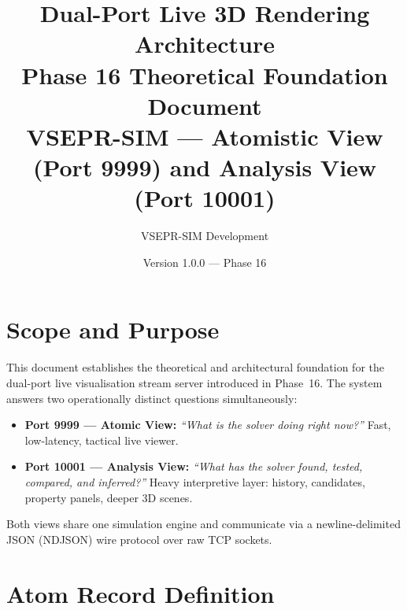 ﻿\documentclass[11pt]{article}
\title{\textbf{Dual-Port Live 3D Rendering Architecture} \\
\Large Phase 16 Theoretical Foundation Document \\[6pt]
\large VSEPR-SIM --- Atomistic View (Port 9999) and Analysis View (Port 10001)}
\author{VSEPR-SIM Development}
\date{Version 1.0.0 --- Phase 16}
\begin{document}
\maketitle
\tableofcontents
\newpage

\section{Scope and Purpose}

This document establishes the theoretical and architectural foundation for the
dual-port live visualisation stream server introduced in Phase~16.
The system answers two operationally distinct questions simultaneously:

\begin{itemize}[noitemsep]
  \item \textbf{Port 9999 --- Atomic View:}
        \emph{``What is the solver doing right now?''}
        Fast, low-latency, tactical live viewer.
  \item \textbf{Port 10001 --- Analysis View:}
        \emph{``What has the solver found, tested, compared, and inferred?''}
        Heavy interpretive layer: history, candidates, property panels,
        deeper 3D scenes.
\end{itemize}

Both views share one simulation engine and communicate via a
newline-delimited JSON (NDJSON) wire protocol over raw TCP sockets.

\section{Atom Record Definition}
\label{sec:atomrecord}
\end{document}
